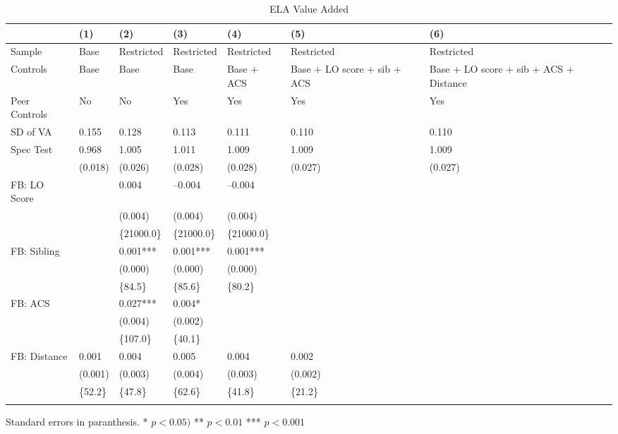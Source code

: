 \begin{table}[tbp] \centering
{}

\caption{ELA Value Added}
{\footnotesize
\begin{tabularx}{\linewidth}{lCCCCCC}

\toprule
&{(1)}&{(2)}&{(3)}&{(4)}&{(5)}&{(6)} \tabularnewline
\midrule \addlinespace[\belowrulesep]
Sample&Base&Restricted&Restricted&Restricted&Restricted&Restricted \tabularnewline
Controls&Base&Base&Base&Base + ACS&Base + LO score + sib + ACS&Base + LO score + sib + ACS + Distance \tabularnewline
Peer Controls&No&No&Yes&Yes&Yes&Yes \tabularnewline
\midrule SD of VA&0.155&0.128&0.113&0.111&0.110&0.110 \tabularnewline
Spec Test&0.968&1.005&1.011&1.009&1.009&1.009 \tabularnewline
&(0.018)&(0.026)&(0.028)&(0.028)&(0.027)&(0.027) \tabularnewline
FB: LO Score&&0.004&--0.004&--0.004&& \tabularnewline
&&(0.004)&(0.004)&(0.004)&& \tabularnewline
&&\{21000.0\}&\{21000.0\}&\{21000.0\}&& \tabularnewline
FB: Sibling&&0.001***&0.001***&0.001***&& \tabularnewline
&&(0.000)&(0.000)&(0.000)&& \tabularnewline
&&\{84.5\}&\{85.6\}&\{80.2\}&& \tabularnewline
FB: ACS&&0.027***&0.004*&&& \tabularnewline
&&(0.004)&(0.002)&&& \tabularnewline
&&\{107.0\}&\{40.1\}&&& \tabularnewline
FB: Distance&0.001&0.004&0.005&0.004&0.002& \tabularnewline
&(0.001)&(0.003)&(0.004)&(0.003)&(0.002)& \tabularnewline
&\{52.2\}&\{47.8\}&\{62.6\}&\{41.8\}&\{21.2\}& \tabularnewline
\bottomrule \addlinespace[\belowrulesep]

\end{tabularx}
\begin{flushleft}
\footnotesize Standard errors in paranthesis. * \(p<0.05)\) ** \(p<0.01\) *** \(p<0.001\)
\end{flushleft}
}
\end{table}
